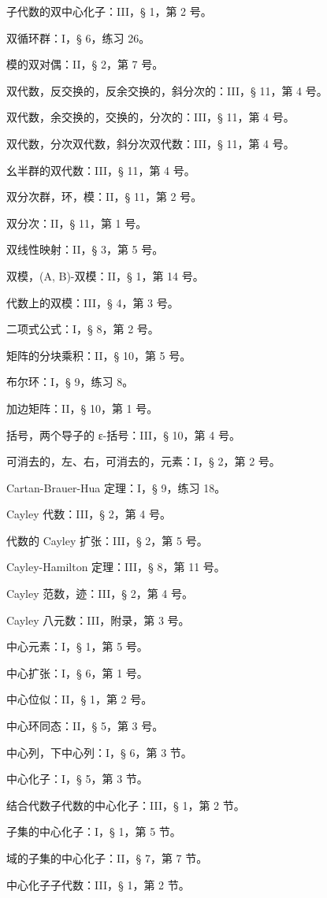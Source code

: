 子代数的双中心化子：III，§ 1，第 2 号。

双循环群：I，§ 6，练习 26。

模的双对偶：II，§ 2，第 7 号。

双代数，反交换的，反余交换的，斜分次的：III，§ 11，第 4 号。

双代数，余交换的，交换的，分次的：III，§ 11，第 4 号。

双代数，分次双代数，斜分次双代数：III，§ 11，第 4 号。

幺半群的双代数：III，§ 11，第 4 号。

双分次群，环，模：II，§ 11，第 2 号。

双分次：II，§ 11，第 1 号。

双线性映射：II，§ 3，第 5 号。

双模，(A, B)-双模：II，§ 1，第 14 号。

代数上的双模：III，§ 4，第 3 号。

二项式公式：I，§ 8，第 2 号。

矩阵的分块乘积：II，§ 10，第 5 号。

布尔环：I，§ 9，练习 8。

加边矩阵：II，§ 10，第 1 号。

括号，两个导子的 ε-括号：III，§ 10，第 4 号。

可消去的，左、右，可消去的，元素：I，§ 2，第 2 号。

Cartan-Brauer-Hua 定理：I，§ 9，练习 18。

Cayley 代数：III，§ 2，第 4 号。

代数的 Cayley 扩张：III，§ 2，第 5 号。

Cayley-Hamilton 定理：III，§ 8，第 11 号。

Cayley 范数，迹：III，§ 2，第 4 号。

Cayley 八元数：III，附录，第 3 号。

中心元素：I，§ 1，第 5 号。

中心扩张：I，§ 6，第 1 号。

中心位似：II，§ 1，第 2 号。

中心环同态：II，§ 5，第 3 号。

中心列，下中心列：I，§ 6，第 3 节。

中心化子：I，§ 5，第 3 节。

结合代数子代数的中心化子：III，§ 1，第 2 节。

子集的中心化子：I，§ 1，第 5 节。

域的子集的中心化子：II，§ 7，第 7 节。

中心化子子代数：III，§ 1，第 2 节。

